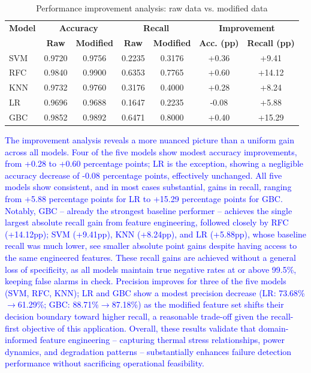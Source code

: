 \begin{table}[htbp]
\centering
\caption{Performance improvement analysis: raw data vs. modified data}
\label{tab:improvement_analysis}
\small
\begin{tabular}{lcccccc}
\hline
\textbf{Model} & \multicolumn{2}{c}{\textbf{Accuracy}} & \multicolumn{2}{c}{\textbf{Recall}} & \multicolumn{2}{c}{\textbf{Improvement}} \\
 & \textbf{Raw} & \textbf{Modified} & \textbf{Raw} & \textbf{Modified} & \textbf{Acc. (pp)} & \textbf{Recall (pp)} \\
\hline
SVM & 0.9720 & 0.9756 & 0.2235 & 0.3176 & +0.36 & +9.41 \\
RFC & 0.9840 & 0.9900 & 0.6353 & 0.7765 & +0.60 & +14.12 \\
KNN & 0.9732 & 0.9760 & 0.3176 & 0.4000 & +0.28 & +8.24 \\
LR & 0.9696 & 0.9688 & 0.1647 & 0.2235 & -0.08 & +5.88 \\
GBC & 0.9852 & 0.9892 & 0.6471 & 0.8000 & +0.40 & +15.29 \\
\hline
\end{tabular}
\end{table}

\textcolor{blue}{The improvement analysis reveals a more nuanced picture than a uniform gain across all models. Four of the five models show modest accuracy improvements, from +0.28 to +0.60 percentage points; LR is the exception, showing a negligible accuracy decrease of -0.08 percentage points, effectively unchanged. All five models show consistent, and in most cases substantial, gains in recall, ranging from +5.88 percentage points for LR to +15.29 percentage points for GBC. Notably, GBC -- already the strongest baseline performer -- achieves the single largest absolute recall gain from feature engineering, followed closely by RFC (+14.12pp); SVM (+9.41pp), KNN (+8.24pp), and LR (+5.88pp), whose baseline recall was much lower, see smaller absolute point gains despite having access to the same engineered features. These recall gains are achieved without a general loss of specificity, as all models maintain true negative rates at or above 99.5\%, keeping false alarms in check. Precision improves for three of the five models (SVM, RFC, KNN); LR and GBC show a modest precision decrease (LR: 73.68\%$\to$61.29\%; GBC: 88.71\%$\to$87.18\%) as the modified feature set shifts their decision boundary toward higher recall, a reasonable trade-off given the recall-first objective of this application. Overall, these results validate that domain-informed feature engineering -- capturing thermal stress relationships, power dynamics, and degradation patterns -- substantially enhances failure detection performance without sacrificing operational feasibility.}

